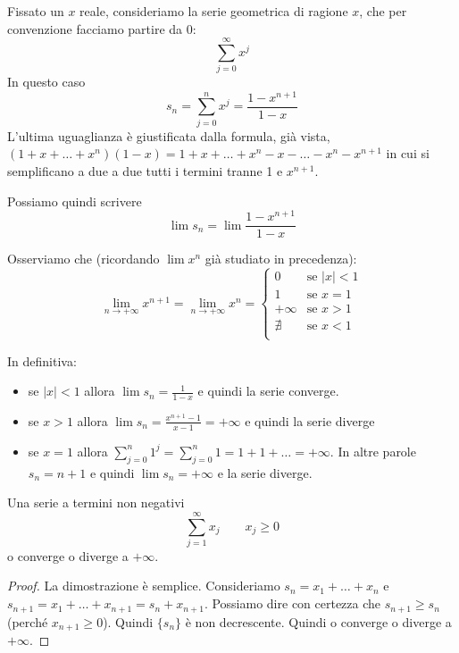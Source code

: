 \begin{example}
Fissato un $x$ reale, consideriamo la serie geometrica di ragione $x$, che per convenzione facciamo partire da 0:
\begin{equation*}
\sum_{j=0}^\infty x^j
\end{equation*}
In questo caso
\begin{equation*}
s_n = \sum_{j=0}^n x^j = \frac{1-x^{n+1}}{1-x}
\end{equation*}
L'ultima uguaglianza è giustificata dalla formula, già vista, $(1+x+\ldots+x^n)(1-x) = 1 + x + \ldots + x^n - x - \ldots - x^n - x^{n+1}$ in cui si semplificano a due a due tutti i termini tranne 1 e $x^{n+1}$.
\end{example}
Possiamo quindi scrivere
\begin{equation*}
\lim s_n = \lim \frac{1-x^{n+1}}{1-x}
\end{equation*}

Osserviamo che (ricordando $\lim x^n$ già studiato in precedenza):
\begin{equation*}
\lim_{n \to +\infty}x^{n+1} = \lim_{n \to +\infty}x^n = 
\begin{cases}
0 & \mbox{se } |x| < 1 \\
1 & \mbox{se } x = 1 \\
+\infty & \mbox{se } x > 1 \\
\nexists & \mbox{se } x < 1 \\
\end{cases}
\end{equation*}

In definitiva:
\begin{itemize}
\item se $|x| < 1$ allora $\lim s_n = \frac{1}{1-x}$ e quindi la serie converge.
\item se $x > 1$ allora $\lim s_n = \frac{x^{n+1}-1}{x-1} = +\infty$ e quindi la serie diverge
\item se $x = 1$ allora $\sum_{j=0}^n 1^j = \sum_{j=0}^n 1 = 1 + 1 + \ldots = +\infty$. In altre parole $s_n=n+1$ e quindi $\lim s_n = +\infty$ e la serie diverge.
\end{itemize}

\begin{proposition}
Una serie a termini non negativi
\begin{equation*}
\sum_{j=1}^\infty x_j \qquad x_j \ge 0
\end{equation*}
o converge o diverge a $+\infty$.
\end{proposition}
\begin{proof}
La dimostrazione è semplice. Consideriamo $s_n = x_1 + \ldots + x_n$ e $s_{n+1} = x_1 + \ldots + x_{n+1} = s_n + x_{n+1}$. Possiamo dire con certezza che $s_{n+1} \ge s_n$ (perché $x_{n+1} \ge 0$). Quindi $\{s_n\}$  è non decrescente. Quindi o converge o diverge a $+\infty$.
\end{proof}

